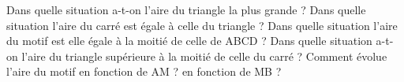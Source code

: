 \exercice Dans quelle situation a-t-on l'aire du triangle la plus grande ?
\exercice Dans quelle situation l'aire du carré est égale à celle du triangle ?
\exercice Dans quelle situation l'aire du motif est elle égale à la moitié de celle de ABCD ?
\exercice Dans quelle situation a-t-on l'aire du triangle supérieure à la moitié de celle du carré ?
\exercice Comment évolue l'aire du motif en fonction de AM ? en fonction de MB ?

